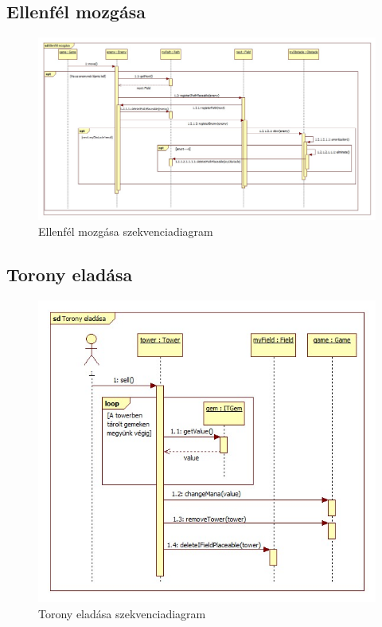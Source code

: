 \subsection{Ellenfél mozgása}
\begin{figure}[H]
\begin{center}
\includegraphics[width=17cm]{chapters/chapter04/images/Ellenfel_mozgasa.jpg}
\caption{Ellenfél mozgása szekvenciadiagram}
\label{fig:Ellenfél_mozgása}
\end{center}
\end{figure}

\subsection{Torony eladása}
\begin{figure}[H]
\begin{center}
\includegraphics[width=17cm]{chapters/chapter04/images/Torony_eladasa.jpg}
\caption{Torony eladása szekvenciadiagram}
\label{fig:Torony_eladása}
\end{center}
\end{figure}

